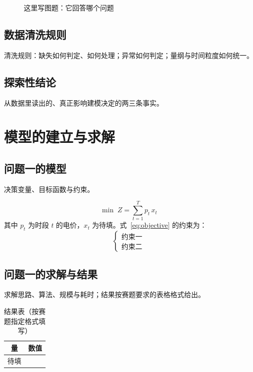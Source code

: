 \documentclass[12pt,a4paper,UTF8]{ctexart}
\begin{document}
\begin{figure}[H]
  \centering
  \caption{这里写图题：它回答哪个问题}
  \label{fig:explore}
\end{figure}

\subsection{数据清洗规则}
清洗规则：缺失如何判定、如何处理；异常如何判定；量纲与时间粒度如何统一。

\subsection{探索性结论}
从数据里读出的、真正影响建模决定的两三条事实。

\section{模型的建立与求解}

\subsection{问题一的模型}
决策变量、目标函数与约束。

\begin{equation}
  \min \; Z = \sum_{t=1}^{T} p_t \, x_t
  \label{eq:objective}
\end{equation}
其中 $p_t$ 为时段 $t$ 的电价，$x_t$ 为待填。式~\eqref{eq:objective} 的约束为：
\begin{equation}
  \begin{cases}
    \text{约束一} \\
    \text{约束二}
  \end{cases}
\end{equation}

\subsection{问题一的求解与结果}
求解思路、算法、规模与耗时；结果按赛题要求的表格格式给出。

\begin{table}[H]
  \centering
  \caption{结果表（按赛题指定格式填写）}
  \begin{tabular}{cc}
    \toprule
    量 & 数值 \\
    \midrule
    待填 & \\
    \bottomrule
  \end{tabular}
\end{table}
\end{document}
